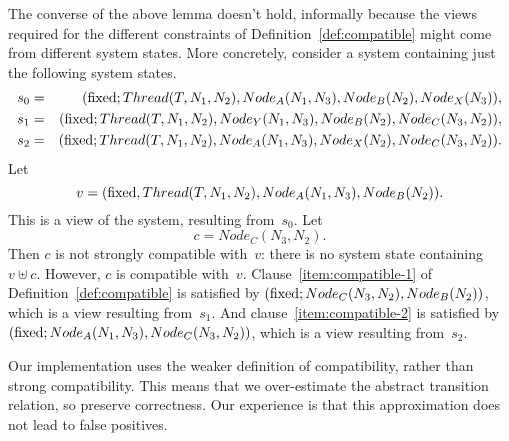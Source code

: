 The converse of the above lemma doesn't hold, informally because the views
required for the different constraints of Definition~\ref{def:compatible}
might come from different system states.  More concretely, consider a system
containing just the following system states.
%
\begin{eqnarray*}
s_0 & = &
   (\mathrm{fixed}; Thread(T,N_1,N_2), Node_A(N_1,N_3), Node_B(N_2), Node_X(N_3)), \\
s_1 & = &
  (\mathrm{fixed}; Thread(T,N_1,N_2), Node_Y(N_1,N_3), Node_B(N_2), Node_C(N_3,N_2)), \\
s_2 & = & 
  (\mathrm{fixed}; Thread(T,N_1,N_2), Node_A(N_1,N_3), Node_X(N_2), Node_C(N_3,N_2)).
\end{eqnarray*}
%
Let 
\[
v = (\mathrm{fixed}, Thread(T, N_1, N_2), Node_A(N_1, N_3), Node_B(N_2)).
\]
This is a view of the system, resulting from~$s_0$.  Let 
\[
c = Node_C(N_3,N_2).
\]  
Then $c$ is not strongly compatible with~$v$: there is no system state
containing $v \uplus c$.  However, $c$ is compatible with~$v$.
%
Clause~\ref{item:compatible-1} of Definition~\ref{def:compatible} is satisfied
by $(\mathrm{fixed}; Node_C(N_3,N_2), Node_B(N_2))$, which is a view resulting
from~$s_1$.
%
And clause~\ref{item:compatible-2} is satisfied by $(\mathrm{fixed}; Node_A(N_1, N_3),
Node_C(N_3,N_2))$, which is a view resulting from~$s_2$.

Our implementation uses the weaker definition of compatibility, rather than
strong compatibility.  This means that we over-estimate the abstract
transition relation, so preserve correctness.  Our experience is that this
approximation does not lead to false positives. 






